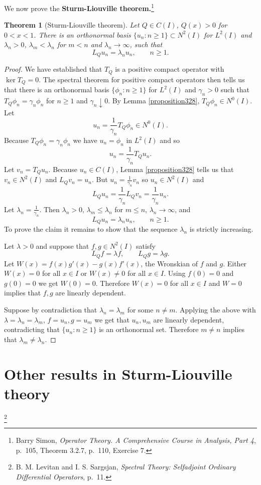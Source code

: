 \documentclass{article}
\newtheorem{theorem}{Theorem}
\theoremstyle{definition}
\begin{document}
We now prove the \textbf{Sturm-Liouville theorem.}\footnote{Barry Simon, {\em Operator Theory. A Comprehensive Course in Analysis, Part 4},
p.~105, Theorem 3.2.7, p.~110, Exercise 7.}

\begin{theorem}[Sturm-Liouville theorem]
Let $Q \in C(I)$, $Q(x)>0$ for $0<x<1$. There is an orthonormal basis $\{u_n: n \geq 1\} \subset
N^2(I)$ for $L^2(I)$ and $\lambda_n >0$, $\lambda_m < \lambda_n$ for $m < n$ and 
$\lambda_n \to \infty$,
such that
\[
L_Q u_n = \lambda_n u_n,\qquad n \geq 1.
\]
\end{theorem}
\begin{proof}
We have established that $T_Q$ is a positive compact operator with $\ker T_Q=0$. 
The spectral theorem for positive compact operators then tells us that 
there is an orthonormal basis $\{\phi_n: n \geq 1\}$ for $L^2(I)$ and $\gamma_n>0$ such that
$T_Q \phi_n=\gamma_n \phi_n$ for $n \geq 1$ and $\gamma_n \downarrow 0$. 
By Lemma \ref{proposition328}, $T_Q \phi_n \in N^0(I)$. Let
\[
u_n = \frac{1}{\gamma_n} T_Q \phi_n \in N^0(I).
\]
Because $T_Q \phi_n = \gamma_n \phi_n$ we have
$u_n = \phi_n$ in $L^2(I)$ and so
\[
u_n = \frac{1}{\gamma_n} T_Q u_n.
\]
Let $v_n = T_Q u_n$. Because $u_n \in C(I)$, 
Lemma \ref{proposition328} tells us that $v_n \in N^2(I)$ and $L_Q v_n=u_n$. 
But $u_n = \frac{1}{\gamma_n} v_n$ so $u_n \in N^2(I)$ and 
\[
L_Q u_n = \frac{1}{\gamma_n} L_Q v_n = \frac{1}{\gamma_n} u_n.
\]
Let $\lambda_n = \frac{1}{\gamma_n}$. Then $\lambda_n>0$, $\lambda_m \leq \lambda_n$ for $m \leq n$,
$\lambda_n \to \infty$, and
\[
L_Q u_n = \lambda_n u_n,\qquad n \geq 1.
\]
To prove the claim it remains to show that the sequence $\lambda_n$ is strictly increasing. 

Let $\lambda>0$ and suppose that $f,g \in N^2(I)$ satisfy
\[
L_Q f=\lambda f,\qquad L_Q g = \lambda g.
\] 
Let $W(x)=f(x)g'(x)-g(x)f'(x)$, the Wronskian of $f$ and $g$.
Either $W(x)=0$ for all $x \in I$ or $W(x) \neq 0$ for all $x \in I$. 
Using $f(0)=0$ and $g(0)=0$ we get
$W(0)=0$. Therefore $W(x)=0$ for all $x \in I$ and $W=0$ implies
that $f,g$ are linearly dependent.

Suppose by contradiction that $\lambda_n=\lambda_m$ for some $n \neq m$. 
Applying the above with $\lambda=\lambda_n=\lambda_m$,
$f=u_n, g=u_m$ we get that 
$u_n,u_m$ are linearly dependent, contradicting that $\{u_n: n \geq 1\}$ is an orthonormal set.
Therefore $m \neq n$ implies that $\lambda_m \neq \lambda_n$.  
\end{proof}



\section{Other results in Sturm-Liouville theory}
\footnote{B. M. Levitan and I. S. Sargsjan,
{\em Spectral Theory: Selfadjoint Ordinary Differential Operators}, p.~11.}
\end{document}
